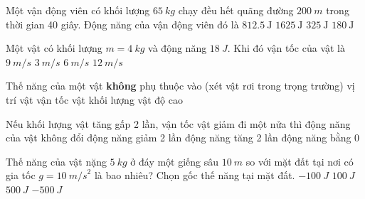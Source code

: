 \begin{ex}
	Một vận động viên có khối lượng $\SI{65}{kg}$ chạy đều hết quãng đường $\SI{200}{m}$ trong thời gian 40 giây. Động năng của vận động viên đó là
	\choice
	{\True $\SI{812.5}{\joule}$}
	{$\SI{1625}{\joule}$}
	{$\SI{325}{\joule}$}
	{$\SI{180}{\joule}$}
\end{ex}

\begin{ex}
	Một vật có khối lượng $m = \SI{4}{kg}$ và động năng $\SI{18}{J}$. Khi đó vận tốc của vật là
	\choice
	{$\SI{9}{m/s}$}
	{\True $\SI{3}{m/s}$}
	{$\SI{6}{m/s}$}
	{$\SI{12}{m/s}$}
\end{ex}
\begin{ex}
	Thế năng của một vật \textbf{không} phụ thuộc vào (xét vật rơi trong trọng trường)
	\choice
	{vị trí vật}
	{\True vận tốc vật}
	{khối lượng vật}
	{độ cao}
	\loigiai{}
\end{ex}
\begin{ex}
	Nếu khối lượng vật tăng gấp 2 lần, vận tốc vật giảm đi một nửa thì
	\choice
	{động năng của vật không đổi}
	{\True động năng giảm 2 lần}
	{động năng tăng 2 lần}
	{động năng bằng 0}
\end{ex}

	\begin{ex}
		Thế năng của vật nặng $\SI{5}{kg}$ ở đáy một giếng sâu $\SI{10}{m}$ so với mặt đất tại nơi có gia tốc $g = \SI{10}{m/s}^2$ là bao nhiêu? Chọn gốc thế năng tại mặt đất.
		\choice
		{$-\SI{100}{J}$}
		{$\SI{100}{J}$}
		{$\SI{500}{J}$}
		{\True $-\SI{500}{J}$}
	\end{ex}	

